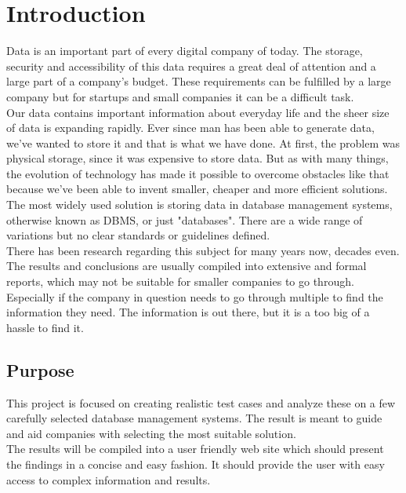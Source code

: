 \chapter{Introduction}
Data is an important part of every digital company of today. The storage, security and accessibility of this data requires a great deal of attention and a large part of a company's budget. These requirements can be fulfilled by a large company but for startups and small companies it can be a difficult task.
\\[0.5cm]
Our data contains important information about everyday life and the sheer size of data is expanding rapidly. Ever since man has been able to generate data, we've wanted to store it and that is what we have done. At first, the problem was physical storage, since it was expensive to store data. But as with many things, the evolution of technology has made it possible to overcome obstacles like that because we've been able to invent smaller, cheaper and more efficient solutions. The most widely used solution is storing data in database management systems, otherwise known as DBMS, or just "databases". There are a wide range of variations but no clear standards or guidelines defined. 
\\[0.5cm]
There has been research regarding this subject for many years now, decades even. The results and conclusions are usually compiled into extensive and formal reports, which may not be suitable for smaller companies to go through. Especially if the company in question needs to go through multiple to find the information they need. The information is out there, but it is a too big of a hassle to find it. 

\section{Purpose}
This project is focused on creating realistic test cases and analyze these on a few carefully selected database management systems. The result is meant to guide and aid companies with selecting the most suitable solution. 
\\[0.5cm]
The results will be compiled into a user friendly web site which should present the findings in a concise and easy fashion. It should provide the user with easy access to complex information and results.

